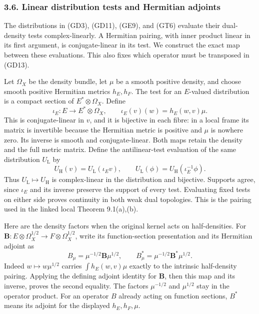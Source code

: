 \documentclass[
  11pt,
]{article}
\makeatletter
\let\ReaderOriginalAnchorStart\hyper@anchorstart
\let\ReaderOriginalAnchorEnd\hyper@anchorend
\let\ReaderPendingAliases\@empty
\def\ReaderArmAliases#1{\gdef\ReaderPendingAliases{#1}}
\def\hyper@anchorstart#1{\ReaderIfNativeAnchorTF{#1}{\ReaderPendingAliases\global\let\ReaderPendingAliases\@empty}{}\ReaderOriginalAnchorStart{#1}}
\makeatother
\begin{document}
\ReaderArmAliases{\ReaderOriginalAnchorStart{linear-distribution-tests-and-hermitian-adjoints}\ReaderOriginalAnchorEnd}
\subsubsection{3.6. Linear distribution tests and Hermitian
adjoints}\label{linear-distribution-tests-and-hermitian-adjoints}

The distributions in (GD3), (GD11), (GE9), and (GT6) evaluate their
dual-density tests complex-linearly. A Hermitian pairing, with inner
product linear in its first argument, is conjugate-linear in its test.
We construct the exact map between these evaluations. This also fixes
which operator must be transposed in (GD13).

Let \(\Omega_X\) be the density bundle, let \(\mu\) be a smooth positive
density, and choose smooth positive Hermitian metrics \(h_E,h_F\). The
test for an \(E\)-valued distribution is a compact section of
\(E^*\otimes\Omega_X\). Define \[
 \iota_E:E\longrightarrow E^*\otimes\Omega_X,\qquad
 \iota_E(v)(w)=h_E(w,v)\mu .
 \tag{DT1}
\] This is conjugate-linear in \(v\), and it is bijective in each fibre:
in a local frame its matrix is invertible because the Hermitian metric
is positive and \(\mu\) is nowhere zero. Its inverse is smooth and
conjugate-linear. Both maps retain the density and the full metric
matrix. Define the antilinear-test evaluation of the same distribution
\(U_{\mathrm L}\) by \[
 U_{\mathrm H}(v)=U_{\mathrm L}(\iota_Ev),\qquad
 U_{\mathrm L}(\phi)=U_{\mathrm H}(\iota_E^{-1}\phi).
 \tag{DT2}
\] Thus \(U_{\mathrm L}\mapsto U_{\mathrm H}\) is complex-linear in the
distribution and bijective. Supports agree, since \(\iota_E\) and its
inverse preserve the support of every test. Evaluating fixed tests on
either side proves continuity in both weak dual topologies. This is the
pairing used in the linked local Theorem 9.1(a),(b).

Here are the density factors when the original kernel acts on
half-densities. For
\(\mathbf B:E\otimes\Omega_X^{1/2}\to F\otimes\Omega_X^{1/2}\), write
its function-section presentation and its Hermitian adjoint as \[
 B_\mu=\mu^{-1/2}\mathbf B\mu^{1/2},\qquad
 B_\mu^*=\mu^{-1/2}\mathbf B^*\mu^{1/2}.
 \tag{DT3}
\] Indeed \(w\mapsto w\mu^{1/2}\) carries \(\int h_E(w,v)\mu\) exactly
to the intrinsic half-density pairing. Applying the defining adjoint
identity for \(\mathbf B\), then this map and its inverse, proves the
second equality. The factors \(\mu^{-1/2}\) and \(\mu^{1/2}\) stay in
the operator product. For an operator \(B\) already acting on function
sections, \(B^*\) means its adjoint for the displayed \(h_E,h_F,\mu\).
\end{document}
